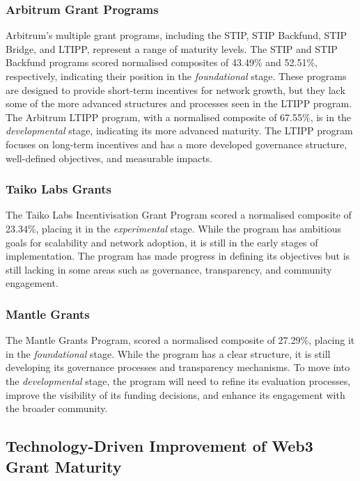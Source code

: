 \documentclass[conference]{IEEEtran}
\begin{document}
\subsubsection{Arbitrum Grant Programs}\label{sec_4.2.2}
Arbitrum’s multiple grant programs, including the STIP, STIP Backfund, STIP Bridge, and LTIPP, represent a range of maturity levels. The STIP and STIP Backfund programs scored normalised composites of 43.49\% and 52.51\%, respectively, indicating their position in the \textit{foundational} stage. These programs are designed to provide short-term incentives for network growth, but they lack some of the more advanced structures and processes seen in the LTIPP program. The Arbitrum LTIPP program, with a normalised composite of 67.55\%, is in the \textit{developmental} stage, indicating its more advanced maturity. The LTIPP program focuses on long-term incentives and has a more developed governance structure, well-defined objectives, and measurable impacts.

\subsubsection{Taiko Labs Grants}\label{sec_4.2.3}
The Taiko Labs Incentivisation Grant Program scored a normalised composite of 23.34\%, placing it in the \textit{experimental} stage. While the program has ambitious goals for scalability and network adoption, it is still in the early stages of implementation. The program has made progress in defining its objectives but is still lacking in some areas such as governance, transparency, and community engagement.

\subsubsection{Mantle Grants}\label{sec_4.2.4}
The Mantle Grants Program, scored a normalised composite of 27.29\%, placing it in the \textit{foundational} stage. While the program has a clear structure, it is still developing its governance processes and transparency mechanisms. To move into the \textit{developmental} stage, the program will need to refine its evaluation processes, improve the visibility of its funding decisions, and enhance its engagement with the broader community.

\subsection{Technology-Driven Improvement of Web3 Grant Maturity}\label{sec_4.3}
\end{document}
